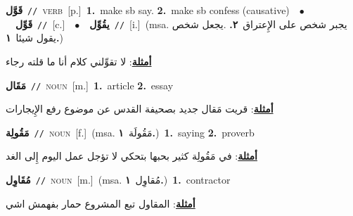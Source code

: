 \documentclass[10pt,a4paper,twoside]{article} %
\begin{document}
\begin{multicols}{2}
{\setlength\topsep{0pt}\textbf{\foreignlanguage{arabic}{قَوَّل}}\ {\color{gray}\texttt{//}\color{black}}\ \textsc{verb}\ [p.]\ \textbf{1.}~make sb say.  \textbf{2.}~make sb confess (causative)\ \ $\bullet$\ \ \setlength\topsep{0pt}\textbf{\foreignlanguage{arabic}{قَوِّل}}\ {\color{gray}\texttt{//}\color{black}}\ [c.]\ \ $\bullet$\ \ \setlength\topsep{0pt}\textbf{\foreignlanguage{arabic}{يقُوِّل}}\ {\color{gray}\texttt{//}\color{black}}\ [i.]\ \color{gray}(msa. \foreignlanguage{arabic}{يجبر شخص على الإِعتراق}~\foreignlanguage{arabic}{\textbf{٢.}}  .\foreignlanguage{arabic}{يجعل شخص يقول شيئا}~\foreignlanguage{arabic}{\textbf{١.}})\color{black}\  \begin{flushright}\color{gray}\foreignlanguage{arabic}{\textbf{\underline{\foreignlanguage{arabic}{أمثلة}}}: لا تقوِّلني كلام أنا ما قلته رجاء}\end{flushright}\color{black}} \vspace{2mm}

{\setlength\topsep{0pt}\textbf{\foreignlanguage{arabic}{مَقَال}}\ {\color{gray}\texttt{//}\color{black}}\ \textsc{noun}\ [m.]\ \textbf{1.}~article  \textbf{2.}~essay\  \begin{flushright}\color{gray}\foreignlanguage{arabic}{\textbf{\underline{\foreignlanguage{arabic}{أمثلة}}}: قريت مَقال جديد بصحيفة القدس عن موضوع رفع الإِيجارات}\end{flushright}\color{black}} \vspace{2mm}

{\setlength\topsep{0pt}\textbf{\foreignlanguage{arabic}{مَقُولِة}}\ {\color{gray}\texttt{//}\color{black}}\ \textsc{noun}\ [f.]\ \color{gray}(msa. \foreignlanguage{arabic}{مَقُولَة}~\foreignlanguage{arabic}{\textbf{١.}})\color{black}\ \textbf{1.}~saying  \textbf{2.}~proverb\  \begin{flushright}\color{gray}\foreignlanguage{arabic}{\textbf{\underline{\foreignlanguage{arabic}{أمثلة}}}: في مَقُولِة كثير بحبها بتحكي لا تؤجل عمل اليوم إِلى الغد}\end{flushright}\color{black}} \vspace{2mm}

{\setlength\topsep{0pt}\textbf{\foreignlanguage{arabic}{مُقَاوِل}}\ {\color{gray}\texttt{//}\color{black}}\ \textsc{noun}\ [m.]\ \color{gray}(msa. \foreignlanguage{arabic}{مُقاوِل}~\foreignlanguage{arabic}{\textbf{١.}})\color{black}\ \textbf{1.}~contractor\  \begin{flushright}\color{gray}\foreignlanguage{arabic}{\textbf{\underline{\foreignlanguage{arabic}{أمثلة}}}: المقاول تبع المشروع حمار بفهمش اشي}\end{flushright}\color{black}} \vspace{2mm}


\end{multicols}
\end{document}
